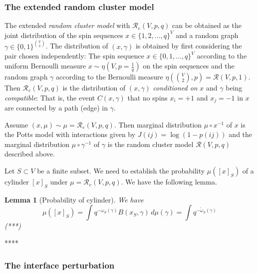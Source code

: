 \documentclass[11pt, a4paper]{amsart}
\newtheorem{lem}[thm]{Lemma}
\theoremstyle{definition}
\theoremstyle{remark}
\renewcommand{\d}{\,d}
\providecommand{\mscr}{\mathscr}
\providecommand{\g}{\gamma}
\providecommand{\w}{\omega}
\begin{document}
\subsubsection{The extended random cluster model}
The extended \emph{random cluster model} with $\mscr R_e(V,p,q)$ can be obtained
as the joint distribution of the spin sequences $x\in\{1,2,\dots,q\}^{V}$ and a
random graph $\gamma\in\{0,1\}^{\binom V2}$. The distribution of $(x,\gamma)$ is obtained by
first considering the pair chosen independently: The spin sequence
$x\in\{0,1,\dots,q\}^{V}$ according to the uniform Bernoulli measure
$x\sim\eta(V,p=\frac1q)$ on the spin sequences and the random graph $\gamma$ according to
the Bernoulli measure $\eta(\binom V2, p)=\mscr R(V,p,1)$. Then $\mscr R_e(V,p,q)$
is the distribution of $(x,\gamma)$ \emph{conditioned on} $x$ and $\gamma$ being
\emph{compatible}: That is, the event $C(x,\g)$ that no spins $x_i=+1$ and
$x_j=-1$ in $x$ are connected by a path (edge) in $\g$.

Assume $(x,\mu)\sim\mu=\mscr R_e(V,p,q)$. Then marginal distribution $\mu\circ x^{-1}$ of $x$
is the Potts model with interactions given by $J(ij)=\log(1-p(ij))$ and the
marginal distribution $\mu\circ\gamma^{-1}$ of $\gamma$ is the random cluster model
$\mscr R(V,p,q)$ described above.

Let $S\subset V$ be a finite subset.
We need to establish the probability $\mu([x]_S)$ of a cylinder $[x]_S$ under
$\mu=\mscr R_e(V,p,q)$. We have the following lemma.

\begin{lem}[Probability of cylinder]
  We have
  \[
    \mu([x]_S) =  \int q^{-\w_S(\g)} B(x_S,\g) \d\mu(\g)
    = \int q^{-\tilde\w_S(\g)} \,
  \]
  (***)
\end{lem}

****

\subsubsection{The interface perturbation}
\end{document}
